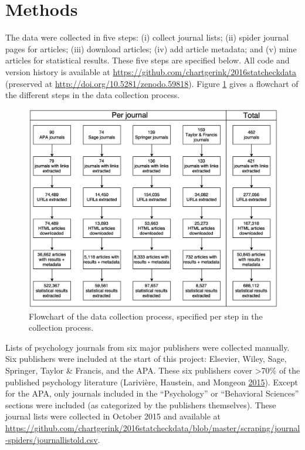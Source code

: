\documentclass[a5paper]{book}
\begin{document}
\section{Methods}\label{methods-1}

The data were collected in five steps: (i) collect journal lists; (ii)
spider journal pages for articles; (iii) download articles; (iv) add
article metadata; and (v) mine articles for statistical results. These
five steps are specified below. All code and version history is
available at \url{https://github.com/chartgerink/2016statcheckdata}
(preserved at \url{http://doi.org/10.5281/zenodo.59818}). Figure
\ref{fig:data-fig1} gives a flowchart of the different steps in the data
collection process.

\begin{figure}[h]

{\centering \includegraphics[width=1\linewidth]{assets/figures/statcheck-fig1} 

}

\caption{Flowchart of the data collection process, specified per step in the collection process.}\label{fig:data-fig1}
\end{figure}

Lists of psychology journals from six major publishers were collected
manually. Six publishers were included at the start of this project:
Elsevier, Wiley, Sage, Springer, Taylor \& Francis, and the APA. These
six publishers cover \textgreater{}70\% of the published psychology
literature (Larivière, Haustein, and Mongeon
\protect\hyperlink{ref-doi:10.1371ux2fjournal.pone.0127502}{2015}).
Except for the APA, only journals included in the \enquote{Psychology}
or \enquote{Behavioral Sciences} sections were included (as categorized
by the publishers themselves). These journal lists were collected in
October 2015 and available at
\url{https://github.com/chartgerink/2016statcheckdata/blob/master/scraping/journal-spiders/journallistold.csv}.
\end{document}
